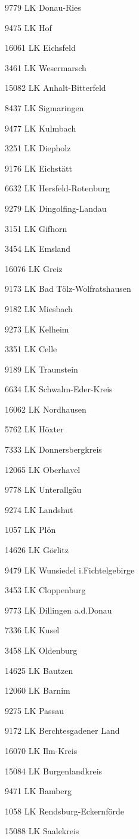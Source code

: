 9779  LK Donau-Ries

9475  LK Hof

16061  LK Eichsfeld

3461  LK Wesermarsch

15082  LK Anhalt-Bitterfeld

8437  LK Sigmaringen

9477  LK Kulmbach

3251  LK Diepholz

9176  LK Eichstätt

6632  LK Hersfeld-Rotenburg

9279  LK Dingolfing-Landau

3151  LK Gifhorn

3454  LK Emsland

16076  LK Greiz

9173  LK Bad Tölz-Wolfratshausen

9182  LK Miesbach

9273  LK Kelheim

3351  LK Celle

9189  LK Traunstein

6634  LK Schwalm-Eder-Kreis

16062  LK Nordhausen

5762  LK Höxter

7333  LK Donnersbergkreis

12065  LK Oberhavel

9778  LK Unterallgäu

9274  LK Landshut

1057  LK Plön

14626  LK Görlitz

9479  LK Wunsiedel i.Fichtelgebirge

3453  LK Cloppenburg

9773  LK Dillingen a.d.Donau

7336  LK Kusel

3458  LK Oldenburg

14625  LK Bautzen

12060  LK Barnim

9275  LK Passau

9172  LK Berchtesgadener Land

16070  LK Ilm-Kreis

15084  LK Burgenlandkreis

9471  LK Bamberg

1058  LK Rendsburg-Eckernförde

15088  LK Saalekreis

